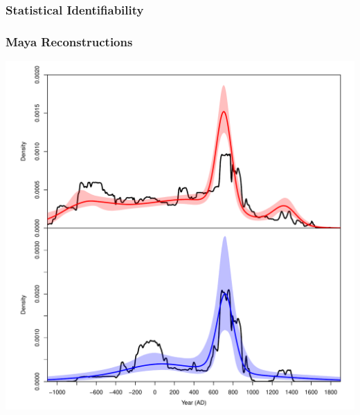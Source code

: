 \documentclass{beamer}
\begin{document}
\begin{frame}[t]
  \frametitle{Statistical Identifiability}
\end{frame}

\begin{frame}[t]
  \frametitle{Maya Reconstructions}
    \includegraphics[height=.85\textheight]{Fig2_maya_inference_K10.pdf}
\end{frame}
\end{document}
